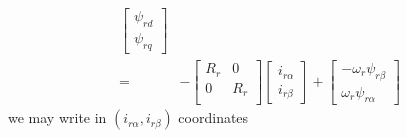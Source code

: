\documentclass[12pt,a4paper]{scrartcl}
\begin{document}
\begin{onehalfspace}
\begin{equation}
\begin{split}
		\left[
		\begin{matrix}
			\psi_{rd} \\[6pt]
			\psi_{rq}
		\end{matrix} \right] \\[6pt]
		= & -
		\left[
		\begin{matrix}
			R_r & 0 \\[6pt]
			0 & R_r \\[6pt]
		\end{matrix} \right]
		\left[
		\begin{matrix}
			i_{r\alpha} \\[6pt]
			i_{r\beta}
		\end{matrix} \right] + 
		\left[
		\begin{matrix}
			-\omega_r{\psi}_{r\beta} \\[6pt]
			\omega_r{\psi}_{r\alpha}
		\end{matrix} \right]
	\end{split}
\end{equation}
we may write in $(i_{r\alpha}, i_{r\beta})$ coordinates
\begin{flalign} \label{eq37}
		\left[
		\begin{matrix}
			\dot{\psi}_{s\alpha} \\[6pt]
			\dot{\psi}_{s\beta}
		\end{matrix} \right] + 
		\left[
		\begin{matrix}
			R_s & 0 \\[6pt]
			0 & R_s \\[6pt]
		\end{matrix} \right]
		\left[
		\begin{matrix}
			i_{s\alpha} \\[6pt]
			i_{s\beta}
		\end{matrix} \right] = &
		\left[
		\begin{matrix}
			u_{s\alpha} \\[6pt]
			u_{s\beta}
		\end{matrix}
		\right] \\[6pt]
		\left[
		\begin{matrix}
			\dot{\psi}_{r\alpha} \\[6pt]
			\dot{\psi}_{r\beta}
		\end{matrix} \right] + 
		\left[
		\begin{matrix}
			R_r & 0 \\[6pt]
			0 & R_r \\[6pt]
		\end{matrix} \right]
		\left[

\end{flalign}
\end{onehalfspace}
\end{document}
